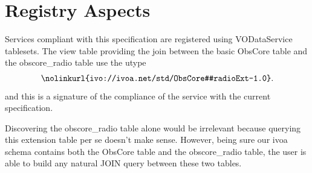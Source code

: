 \documentclass[11pt,a4paper]{ivoa}
\begin{document}
%
%
%
%
%

\section{Registry Aspects}
\label{sec:registry}

Services compliant with this specification are registered using
VODataService \citep{2021ivoa.spec.1102D} tablesets. The view table providing the
join between the basic ObsCore table  and the obscore\_radio table
use the utype
$$
\hbox{\nolinkurl{ivo://ivoa.net/std/ObsCore#radioExt-1.0}.}
$$
and this is a signature of the compliance of the service with the current specification.

Discovering the obscore\_radio table alone would be  irrelevant  because querying this
extension table per se doesn't make sense.
However, being sure our ivoa schema  contains both the ObsCore table and the obscore\_radio table,
the user is able  to  build any natural JOIN query between these two tables. 
\end{document}
